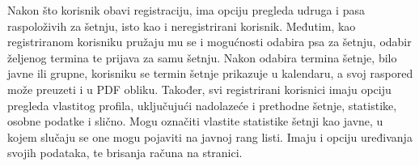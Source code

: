 \begin{packed_item}
\begin{packed_item}
                        Nakon što korisnik obavi registraciju, ima opciju pregleda udruga i pasa raspoloživih za šetnju, isto kao i neregistrirani korisnik. Međutim, kao registriranom korisniku pružaju mu se i mogućnosti odabira psa za šetnju, odabir željenog termina te prijava za samu šetnju.  Nakon odabira termina šetnje, bilo javne ili grupne, korisniku se termin šetnje prikazuje u kalendaru, a svoj raspored može preuzeti i u PDF obliku.
                        Također, svi registrirani korisnici imaju opciju pregleda vlastitog profila, uključujući nadolazeće i prethodne šetnje, statistike, osobne podatke i slično. Mogu označiti vlastite statistike šetnji kao javne, u kojem slučaju se one mogu pojaviti na javnoj rang listi.
                        Imaju i opciju uređivanja svojih podataka, te brisanja računa na stranici.
            \end{packed_item}
            

\end{packed_item}
